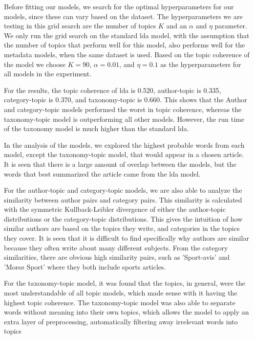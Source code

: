 Before fitting our models, we search for the optimal hyperparameters for our models, since these can vary based on the dataset.
The hyperparameters we are testing in this grid search are the number of topics $K$ and an $\alpha$ and $\eta$ parameter.
We only run the grid search on the standard \gls{lda} model, with the assumption that the number of topics that perform well for this model, also performs well for the metadata models, when the same dataset is used.
Based on the topic coherence of the model we choose $K = 90$, $\alpha = 0.01$, and $\eta = 0.1$ as the hyperparameters for all models in the experiment.

For the results, the topic coherence of \gls{lda} is 0.520, author-topic is 0.335, category-topic is 0.370, and taxonomy-topic is 0.660.
This shows that the Author and category-topic models performed the worst in topic coherence, whereas the taxonomy-topic model is outperforming all other models.
However, the run time of the taxonomy model is much higher than the standard \gls{lda}.

In the analysis of the models, we explored the highest probable words from each model, except the taxonomy-topic model, that would appear in a chosen article.
It is seen that there is a large amount of overlap between the models, but the words that best summarized the article came from the \gls{lda} model.

For the author-topic and category-topic models, we are also able to analyze the similarity between author pairs and category pairs.
This similarity is calculated with the symmetric Kullback-Leibler divergence of either the author-topic distributions or the category-topic distributions.
This gives the intuition of how similar authors are based on the topics they write, and categories in the topics they cover.
It is seen that it is difficult to find specifically why authors are similar because they often write about many different subjects.
From the category similarities, there are obvious high similarity pairs, such as 'Sport-avis' and 'Morsø Sport' where they both include sports articles.

For the taxonomy-topic model, it was found that the topics, in general, were the most understandable of all topic models, which made sense with it having the highest topic coherence.
The taxonomy-topic model was also able to separate words without meaning into their own topics, which allows the model to apply an extra layer of preprocessing, automatically filtering away irrelevant words into topics


